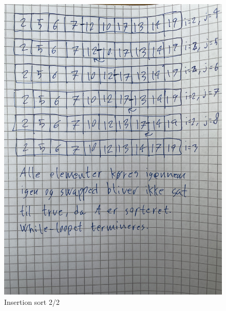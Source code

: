 \documentclass[a4paper,12pt]{article}
\begin{document}
\begin{figure}[H]
    \centering
    \includegraphics[scale=0.13, angle=-90]{IMG_2073.jpg}
    \caption{Insertion sort 2/2}
\end{figure}
\end{document}

